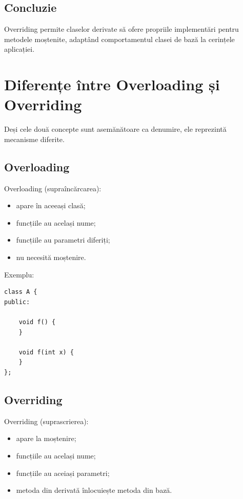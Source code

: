 \documentclass[12pt,a4paper]{article}
\begin{document}
\subsection{Concluzie}

Overriding permite claselor derivate să ofere propriile implementări pentru metodele moștenite, adaptând comportamentul clasei de bază la cerințele aplicației.




\section{Diferențe între Overloading și Overriding}

Deși cele două concepte sunt asemănătoare ca denumire, ele reprezintă mecanisme diferite.

\subsection{Overloading}

Overloading (supraîncărcarea):

\begin{itemize}
\item apare în aceeași clasă;
\item funcțiile au același nume;
\item funcțiile au parametri diferiți;
\item nu necesită moștenire.
\end{itemize}

Exemplu:

\begin{verbatim}
class A {
public:

    void f() {
    }

    void f(int x) {
    }
};
\end{verbatim}

\subsection{Overriding}

Overriding (suprascrierea):

\begin{itemize}
\item apare la moștenire;
\item funcțiile au același nume;
\item funcțiile au aceiași parametri;
\item metoda din derivată înlocuiește metoda din bază.
\end{itemize}
\end{document}
